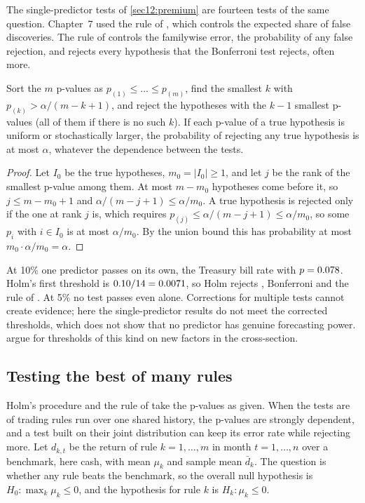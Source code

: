\begin{chapterrefs}
The single-predictor tests of \cref{sec12:premium} are fourteen tests of the same question. Chapter~7 used
the rule of \textcite{benjamini1995}, which controls the expected share of false discoveries. The rule of
\textcite{holm1979} controls the familywise error, the probability of any false rejection, and rejects every hypothesis that the
Bonferroni test rejects, often more.

\begin{proposition}\label{prop12:holm}
Sort the $m$ p-values as $p_{(1)}\le\dots\le p_{(m)}$, find the smallest $k$ with $p_{(k)}>\alpha/(m-k+1)$, and
reject the hypotheses with the $k-1$ smallest p-values (all of them if there is no such $k$). If each p-value of a
true hypothesis is uniform or stochastically larger, the probability of rejecting any true hypothesis is
at most $\alpha$, whatever the dependence between the tests.
\end{proposition}

\begin{proof}
Let $I_0$ be the true hypotheses, $m_0=|I_0|\ge1$, and let $j$ be the rank of the smallest p-value among them.
At most $m-m_0$ hypotheses come before it, so $j\le m-m_0+1$ and $\alpha/(m-j+1)\le\alpha/m_0$. A true
hypothesis is rejected only if the one at rank $j$ is, which requires $p_{(j)}\le\alpha/(m-j+1)\le\alpha/m_0$, so
some $p_i$ with $i\in I_0$ is at most $\alpha/m_0$. By the union bound this has probability at most
$m_0\cdot\alpha/m_0=\alpha$.
\end{proof}

At 10\% one predictor passes on its own, the Treasury bill rate with $p=0.078$. Holm's first threshold is
$0.10/14=0.0071$, so Holm rejects \ovHolmTen, Bonferroni \ovBonfTen{} and the rule of
\textcite{benjamini1995} \ovBhTen. At 5\% no test passes even alone. Corrections for multiple tests cannot
create evidence; here the single-predictor results do not meet the corrected thresholds, which does
not show that no predictor has genuine forecasting power.
\textcite{harvey2016} argue for thresholds of this kind on new factors in the cross-section.

\subsection{Testing the best of many rules}
\label{sec12:snoop}

Holm's procedure and the rule of \textcite{benjamini1995} take the p-values as given. When the tests are
of trading rules run over one shared history, the p-values are strongly dependent, and a test built on
their joint distribution can keep its error rate while rejecting more. Let $d_{k,t}$ be the return of
rule $k=1,\dots,m$ in month $t=1,\dots,n$ over a benchmark, here cash, with mean $\mu_k$ and sample mean
$\bar d_k$. The question is whether any rule beats the benchmark, so the overall null hypothesis is
$H_0:\max_k\mu_k\le0$, and the hypothesis for rule $k$ is $H_k:\mu_k\le0$.


\end{chapterrefs}
